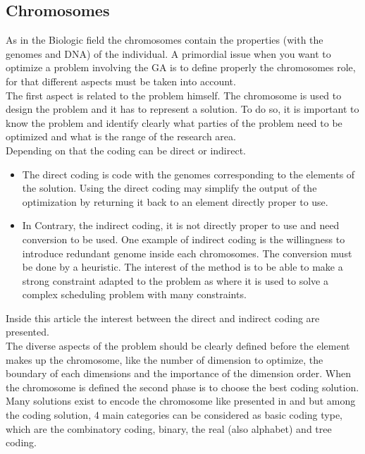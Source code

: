 \subsection{Chromosomes} \label{par:Chromosomes}
As in the Biologic field the chromosomes contain the properties (with the genomes and DNA) of the individual.
A primordial issue when you want to optimize a problem involving the GA is to define properly the chromosomes role, for that different aspects must be taken into account.\\

The first aspect is related to the problem himself. The chromosome is used to design the problem and it has to represent a solution. To do so, it is important to know the problem and identify clearly what parties of the problem need to be optimized and what is the range of the research area. \\
Depending on that the coding can be direct or indirect.
\begin{itemize}
\item The direct coding is code with the genomes corresponding to the elements of the solution. Using the direct coding may simplify the output of the optimization by returning it back to an element directly proper to use.
\item  In Contrary, the indirect coding, it is not directly proper to use and need conversion to be used. One example of indirect coding is the willingness to introduce redundant genome inside each chromosomes.  The conversion must be done by a heuristic. The interest of the method is to be able  to make a strong constraint adapted to the problem as \cite{ 121*ronald1997,131*walters1995}  where it is used to solve a complex scheduling problem with many constraints. 
\end{itemize} 
 Inside this article the interest between the direct and indirect coding are presented.  \\ %
The diverse aspects of the problem should be clearly defined before the element makes up the chromosome, like  the number of dimension to optimize, the boundary of each dimensions and the importance of the dimension order. 
When the chromosome is defined the second phase is to choose the best coding solution. Many solutions exist to encode the chromosome like presented in \cite{131*walters1995} and \cite{123*owais2008}   but among the coding solution, 4 main categories can be considered as  basic coding type,  which are the combinatory coding, binary, the real (also alphabet) and tree coding.

